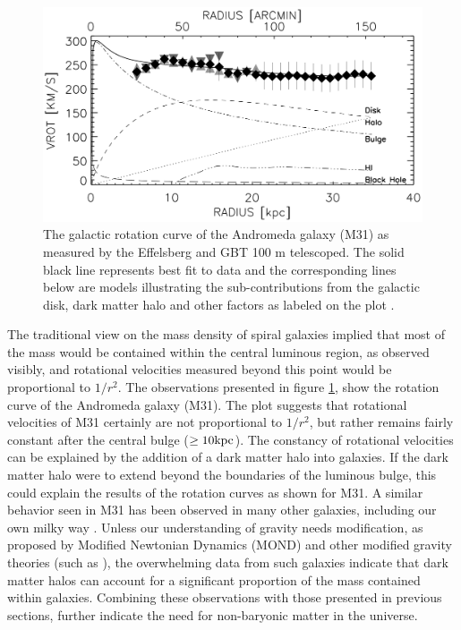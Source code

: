\begin{figure}[ht!]
    \begin{center}
        \includegraphics[scale=0.35]{Chapter_1/Figures/Rotation_curve_M31.jpg}
        \caption[Observed rotation curve and corresponding mass models for the Andromeda galaxy (M31) by using data from the Effelsberg and GBT 100 m observations.]%
        {The galactic rotation curve of the Andromeda galaxy (M31) as measured by the Effelsberg and GBT 100 m telescoped. The solid black line represents best fit to data and the corresponding lines below are models illustrating the sub-contributions from the galactic disk, dark matter halo and other factors as labeled on the plot \cite{Carignan_2006}.}
        \label{fig:rotation_m31}
        \end{center}
\end{figure}

The traditional view on the mass density of spiral galaxies implied that most of the mass would be contained within the central luminous region, as observed visibly, and rotational velocities measured beyond this point would be proportional to $1/r^2$. The observations presented in figure \ref{fig:rotation_m31}, show the rotation curve of the Andromeda galaxy (M31). The plot suggests that rotational velocities of M31 certainly are not proportional to $1/r^2$, but rather remains fairly constant after the central bulge ($\geq 10 \text{kpc}$). The constancy of rotational velocities can be explained by the addition of a dark matter halo into galaxies. If the dark matter halo were to extend beyond the boundaries of the luminous bulge, this could explain the results of the rotation curves as shown for M31. A similar behavior seen in M31 has been observed in many other galaxies, including our own milky way \cite{Carignan_2006, Mr_z_2019}. Unless our understanding of gravity needs modification, as proposed by Modified Newtonian Dynamics (MOND) and other modified gravity theories (such as \cite{Milgrom_2015, Moffat_2006}), the overwhelming data from such galaxies indicate that dark matter halos can account for a significant proportion of the mass contained within galaxies. Combining these observations with those presented in previous sections, further indicate the need for non-baryonic matter in the universe.


